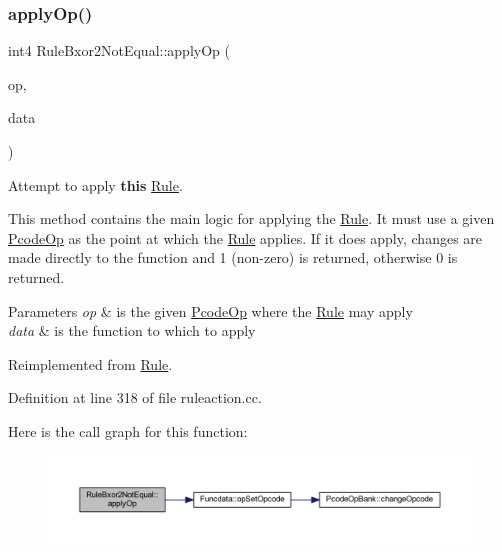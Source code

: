 \subsubsection{\texorpdfstring{applyOp()}{applyOp()}}
{\footnotesize\ttfamily int4 Rule\+Bxor2\+Not\+Equal\+::apply\+Op (\begin{DoxyParamCaption}\item[{\mbox{\hyperlink{class_pcode_op}{Pcode\+Op}} $\ast$}]{op,  }\item[{\mbox{\hyperlink{class_funcdata}{Funcdata}} \&}]{data }\end{DoxyParamCaption})\hspace{0.3cm}{\ttfamily [virtual]}}



Attempt to apply {\bfseries{this}} \mbox{\hyperlink{class_rule}{Rule}}. 

This method contains the main logic for applying the \mbox{\hyperlink{class_rule}{Rule}}. It must use a given \mbox{\hyperlink{class_pcode_op}{Pcode\+Op}} as the point at which the \mbox{\hyperlink{class_rule}{Rule}} applies. If it does apply, changes are made directly to the function and 1 (non-\/zero) is returned, otherwise 0 is returned. 
\begin{DoxyParams}{Parameters}
{\em op} & is the given \mbox{\hyperlink{class_pcode_op}{Pcode\+Op}} where the \mbox{\hyperlink{class_rule}{Rule}} may apply \\
\hline
{\em data} & is the function to which to apply \\
\hline
\end{DoxyParams}


Reimplemented from \mbox{\hyperlink{class_rule_a4e3e61f066670175009f60fb9dc60848}{Rule}}.



Definition at line 318 of file ruleaction.\+cc.

Here is the call graph for this function\+:
\nopagebreak
\begin{figure}[H]
\begin{center}
\leavevmode
\includegraphics[width=350pt]{class_rule_bxor2_not_equal_a82882cbb68487e82f99e41b6753ca21b_cgraph}
\end{center}
\end{figure}
\mbox{\label{class_rule_bxor2_not_equal_a035a4211de0556631e2f3022e56fe24d}} 
